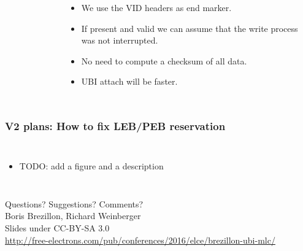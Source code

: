 \documentclass[aspectratio=169,obeyspaces,spaces,hyphens,dvipsnames]{beamer}
\begin{document}
\begin{frame}[fragile]
\begin{columns}
\begin{figure}
     \end{figure}
    \begin{itemize}
    \item We use the VID headers as end marker.
    \item If present and valid we can assume that the write process was not interrupted.
    \item No need to compute a checksum of all data.
    \item UBI attach will be faster.
    \end{itemize}
   \end{columns}
\end{frame}

\begin{frame}[fragile]
\frametitle{V2 plans: How to fix LEB/PEB reservation}
   \begin{columns}
    \begin{itemize}
    \item TODO: add a figure and a description
    \end{itemize}
   \end{columns}
\end{frame}

\begin{frame}
  \begin{center}
  \Huge
  Questions? Suggestions? Comments?\\
  \vspace{1.5cm}
  \huge
  Boris Brezillon, Richard Weinberger\\
  \large
  \vspace{0.5cm}
  \vspace{0.5cm}
  \newline Slides under CC-BY-SA 3.0\\
  \scriptsize
  \url{http://free-electrons.com/pub/conferences/2016/elce/brezillon-ubi-mlc/}
  \end{center}
\end{frame}
\end{document}
